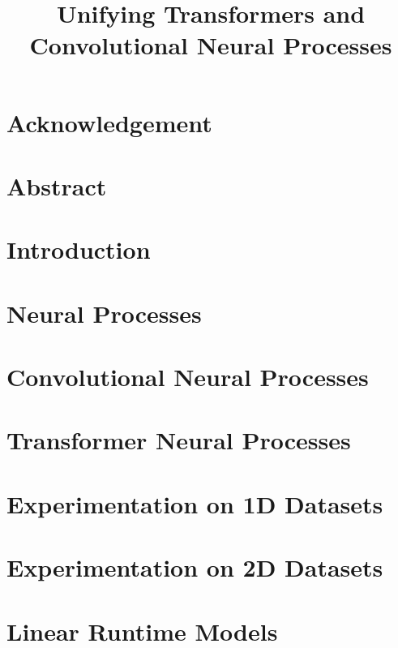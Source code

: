 \documentclass[12pt]{report}
\newcommand{\lrtitle}{
	Unifying Transformers and Convolutional Neural Processes
}
\begin{document}
\title{\textbf{\fontsize{24.88}{12}\selectfont \lrtitle}}
\author{{\LARGE \name}}

\reporttitlepage

\chapter*{Acknowledgement}

\newpage
\chapter*{Abstract}




\chapter{Introduction}


\chapter{Neural Processes}


\chapter{Convolutional Neural Processes}


\chapter{Transformer Neural Processes}



\chapter{Experimentation on 1D Datasets}


\chapter{Experimentation on 2D Datasets}


\chapter{Linear Runtime Models}

\end{document}
